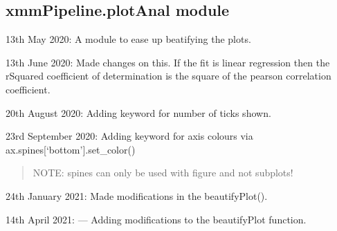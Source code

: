 \documentclass[letterpaper,10pt,english]{sphinxmanual}
\begin{document}
\subsection{xmmPipeline.plotAnal module}
\label{\detokenize{xmmPipeline:module-xmmPipeline.plotAnal}}\label{\detokenize{xmmPipeline:xmmpipeline-plotanal-module}}
\sphinxAtStartPar
13th May 2020:
A module to ease up beatifying the plots.

\sphinxAtStartPar
13th June 2020:
Made changes on this.
If the fit is linear regression then the rSquared coefficient of determination
is the square of the pearson correlation coefficient.

\sphinxAtStartPar
20th August 2020:
Adding keyword for number of ticks shown.

\sphinxAtStartPar
23rd September 2020:
Adding keyword for axis colours via ax.spines{[}‘bottom’{]}.set\_color()
\begin{quote}

\sphinxAtStartPar
NOTE: spines can only be used with figure and not subplots!
\end{quote}

\sphinxAtStartPar
24th January 2021:
Made modifications in the beautifyPlot().

\sphinxAtStartPar
14th April 2021:
—
Adding modifications to the beautifyPlot function.
\end{document}
